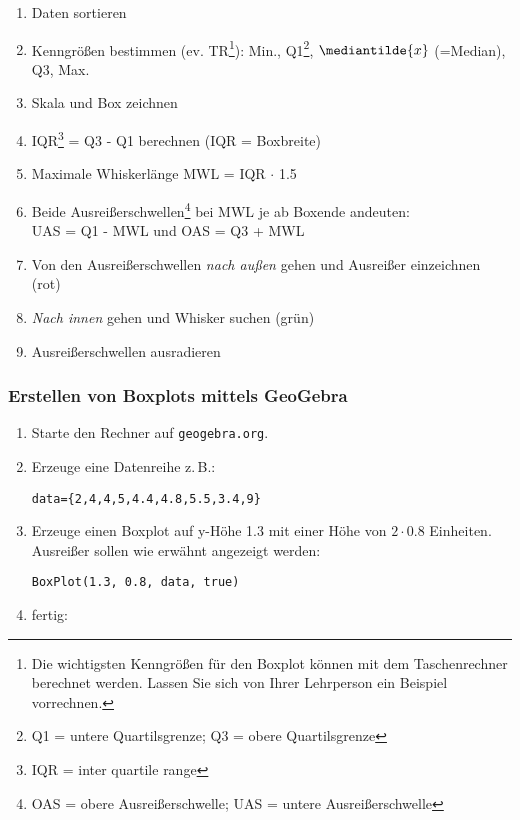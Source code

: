 \begin{rezept}{}{}
  \begin{enumerate}
    \item Daten sortieren
  \item Kenngrößen bestimmen (ev. TR\footnote{Die wichtigsten Kenngrößen für den Boxplot können mit dem Taschenrechner berechnet werden. Lassen Sie sich von Ihrer Lehrperson ein Beispiel vorrechnen.}): Min., Q1\footnote{Q1 = untere
    Quartilsgrenze; Q3 = obere Quartilsgrenze}, $\mediantilde{x}$ (=Median),  Q3, Max.
  \item Skala und Box zeichnen
  \item IQR\footnote{IQR = inter quartile range} = Q3 - Q1
    berechnen (IQR = Boxbreite)
    \item Maximale Whiskerlänge MWL = IQR $\cdot{}$ 1.5
  \item Beide Ausreißerschwellen\footnote{OAS = obere Ausreißerschwelle; UAS = untere Ausreißerschwelle} bei MWL je ab Boxende andeuten:\\
    UAS = Q1 - MWL und OAS = Q3 + MWL
  \item Von den Ausreißerschwellen \textit{nach außen} gehen und
    Ausreißer einzeichnen (rot)
  \item \textit{Nach innen} gehen und Whisker suchen (grün)
  \item Ausreißerschwellen ausradieren
  \end{enumerate}
\end{rezept}
\newpage


\subsubsection{Erstellen von Boxplots mittels GeoGebra}
\begin{enumerate}
\item Starte den Rechner auf \texttt{geogebra.org}.
\item Erzeuge eine Datenreihe z.\,B.:

\texttt{data=\{2,4,4,5,4.4,4.8,5.5,3.4,9\}}


\item Erzeuge einen Boxplot auf y-Höhe 1.3 mit einer Höhe von
  $2\cdot{}0.8$ Einheiten. Ausreißer sollen wie erwähnt angezeigt
  werden:

  \texttt{BoxPlot(1.3, 0.8, data, true)}

\item fertig:


  
\end{enumerate}


